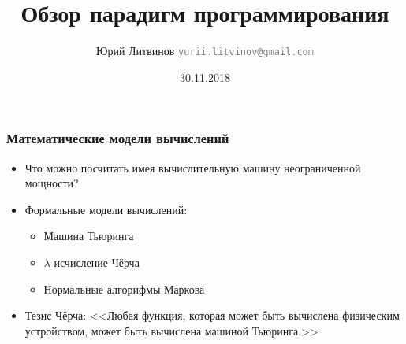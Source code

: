 \documentclass[xetex,mathserif,serif]{beamer}
\title{Обзор парадигм программирования}
\author[Юрий Литвинов]{Юрий Литвинов \newline \textcolor{gray}{\small\texttt{yurii.litvinov@gmail.com}}}
\date{30.11.2018}
\begin{document}
	
	\frame{\titlepage}

	\begin{frame}
		\frametitle{Математические модели вычислений}
		\begin{itemize}
			\item Что можно посчитать имея вычислительную машину неограниченной мощности?
			\item Формальные модели вычислений:
			\begin{itemize}
				\item Машина Тьюринга
				\item $\lambda$-исчисление Чёрча
				\item Нормальные алгорифмы Маркова
			\end{itemize}
			\item Тезис Чёрча: <<Любая функция, которая может быть вычислена физическим устройством, может быть вычислена машиной Тьюринга.>>
		\end{itemize}
	\end{frame}
\end{document}
